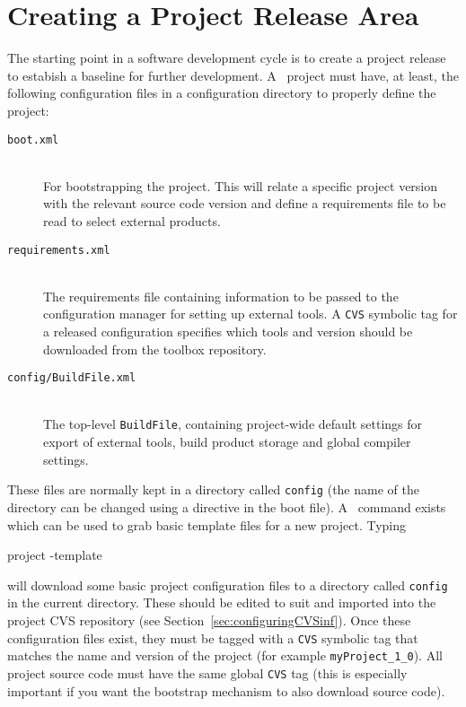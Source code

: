 \section{Creating a Project Release Area}\label{sec:creatProjArea}

The starting point in a software development cycle is to create a project
release to estabish a baseline for further development. 
A \scram\ project must have, at least, the following configuration
files in a configuration directory to properly define the project:
\begin{description}
\item[\texttt{boot.xml}]\mbox{}\\
  For bootstrapping the project. This will relate a specific project
  version with the relevant source code version and define a
  requirements file to be read to select external products.
\item[\texttt{requirements.xml}]\mbox{}\\
  The requirements file containing information to be passed to the
  configuration manager for setting up external tools. A \texttt{CVS}
  symbolic tag for a released configuration specifies which tools and
  version should be downloaded from the toolbox repository.
\item[\texttt{config/BuildFile.xml}]\mbox{}\\
  The top-level \texttt{BuildFile}, containing project-wide default settings for
  export of external tools, build product storage and global compiler settings. 
\end{description}

\ni These files are normally kept in a directory called
\texttt{config} (the name of the directory can be changed using a
directive in the boot file).  A \scram\ command exists
which can be used to grab basic template files for a new project.
Typing

\begin{scramcmd}{project -template}\end{scramcmd}

\ni will download some basic project configuration files to a
directory called \texttt{config} in the current directory. These
should be edited to suit and imported into the project CVS repository
(see Section~\ref{sec:configuringCVSinf}). Once these configuration
files exist, they must be tagged with a \texttt{CVS} symbolic tag that matches the name
and version of the project (for example \texttt{myProject\_1\_0}).
All project source code must have the same global \texttt{CVS} tag (this is
especially important if you want the bootstrap mechanism to also
download source code).

